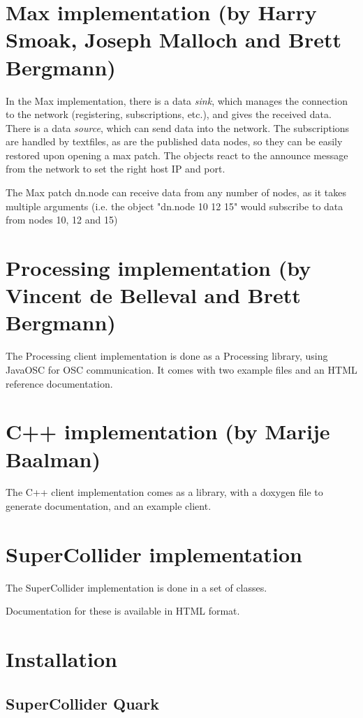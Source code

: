 \documentclass[letterpaper,10pt]{article}
\begin{document}
\section{Max implementation (by Harry Smoak, Joseph Malloch and Brett Bergmann)}
In the Max implementation, there is a data \textit{sink}, which manages the connection to the network (registering, subscriptions, etc.), and gives the received data. There is a data \textit{source}, which can send data into the network. The subscriptions are handled by textfiles, as are the published data nodes, so they can be easily restored upon opening a max patch.
The objects react to the announce message from the network to set the right host IP and port.

The Max patch dn.node can receive data from any number of nodes, as it takes multiple arguments (i.e. the object "dn.node 10 12 15" would subscribe to data from nodes 10, 12 and 15)

\section{Processing implementation (by Vincent de Belleval and Brett Bergmann)}

The Processing client implementation is done as a Processing library, using JavaOSC for OSC communication. It comes with two example files and an HTML reference documentation.

\section{C++ implementation (by Marije Baalman)}

The C++ client implementation comes as a library, with a doxygen file to generate documentation, and an example client.

\section{SuperCollider implementation}

The SuperCollider implementation is done in a set of classes.

Documentation for these is available in HTML format.


\section{Installation}

\subsection{SuperCollider Quark}
\end{document}
